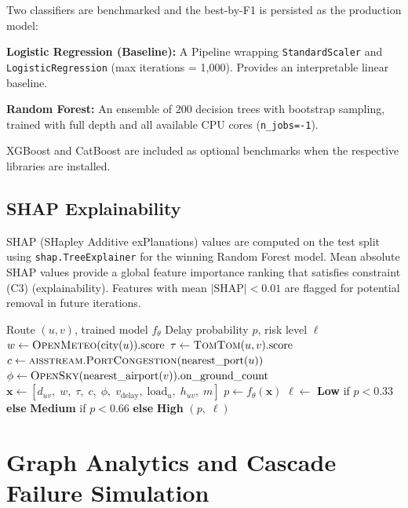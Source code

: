 \documentclass[conference]{IEEEtran}
\begin{document}
Two classifiers are benchmarked and the best-by-F1 is persisted
as the production model:

\textbf{Logistic Regression (Baseline):} A Pipeline wrapping
\texttt{StandardScaler} and \texttt{LogisticRegression} (max
iterations = 1,000). Provides an interpretable linear baseline.

\textbf{Random Forest:} An ensemble of 200 decision trees with
bootstrap sampling, trained with full depth and all available
CPU cores (\texttt{n\_jobs=-1}).

XGBoost and CatBoost are included as optional benchmarks
when the respective libraries are installed.

\subsection{SHAP Explainability}

SHAP (SHapley Additive exPlanations) values are computed on
the test split using \texttt{shap.TreeExplainer} for the winning
Random Forest model. Mean absolute SHAP values provide a global
feature importance ranking that satisfies constraint (C3)
(explainability). Features with mean $|\text{SHAP}| < 0.01$
are flagged for potential removal in future iterations.

\begin{algorithm}
\caption{Delay Prediction with API Feature Injection}
\begin{algorithmic}[1]
\REQUIRE Route $(u, v)$, trained model $f_\theta$
\ENSURE Delay probability $p$, risk level $\ell$
\STATE $w \leftarrow \textsc{OpenMeteo}(\text{city}(u)).\text{score}$
\STATE $\tau \leftarrow \textsc{TomTom}(u, v).\text{score}$
\STATE $c \leftarrow \textsc{aisstream}.\textsc{PortCongestion}(\text{nearest\_port}(u))$
\STATE $\phi \leftarrow \textsc{OpenSky}(\text{nearest\_airport}(v)).\text{on\_ground\_count}$
\STATE $\mathbf{x} \leftarrow [d_{uv},\; w,\; \tau,\; c,\; \phi,\;
  v_{\text{delay}},\; \text{load}_u,\; h_{uv},\; m]$
\STATE $p \leftarrow f_\theta(\mathbf{x})$
\STATE $\ell \leftarrow$ \textbf{Low} if $p < 0.33$ \textbf{else}
  \textbf{Medium} if $p < 0.66$ \textbf{else} \textbf{High}
\RETURN $(p,\; \ell)$
\end{algorithmic}
\end{algorithm}


\section{Graph Analytics and Cascade Failure Simulation}
\end{document}
